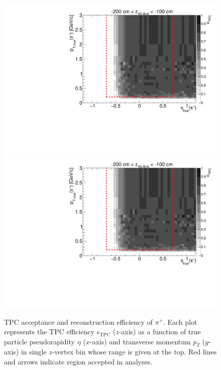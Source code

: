 \begin{figure}[hb]
\caption[TPC acceptance and reconstruction efficiency of $\pi^{+}$.]{TPC acceptance and reconstruction efficiency of $\pi^{+}$. Each plot represents the TPC efficiency $\epsilon_{\text{TPC}}$ ($z$-axis) as a function of true particle pseudorapidity $\eta$ ($x$-axis) and transverse momentum $p_{T}$ ($y$-axis) in single $z$-vertex bin whose range is given at the top. Red lines and arrows indicate region accepted in analyses.}\label{fig:tpcEff_pion_plus}
\centering
\parbox{0.495\textwidth}{
  \centering
  \includegraphics[width=\linewidth,page=3]{graphics/eff/Eff2D_TPC_pion_Plus.pdf}\\
  \includegraphics[width=\linewidth,page=5]{graphics/eff/Eff2D_TPC_pion_Plus.pdf}\\
}
\end{figure}
